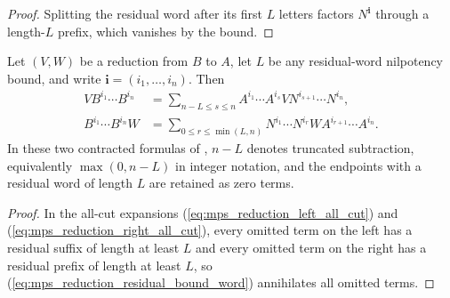 \begin{proof}
    \leanok
    Splitting the residual word after its first $L$ letters factors
    $N^{\mathbf i}$ through a length-$L$ prefix, which vanishes by the bound.
\end{proof}

\begin{lemma}
    \label{thm:mps_reduction_contracted_expansions}
    \leanok
    Let $(V,W)$ be a reduction from $B$ to $A$, let $L$ be any residual-word
    nilpotency bound, and write
    $\mathbf i=(i_1,\ldots,i_n)$.  Then
    \begin{align}
        VB^{i_1}\cdots B^{i_n}
         & =\sum_{n-L\leq s\leq n}
        A^{i_1}\cdots A^{i_s}V
        N^{i_{s+1}}\cdots N^{i_n},
        \label{eq:mps_reduction_left_contracted_expansion} \\
        B^{i_1}\cdots B^{i_n}W
         & =\sum_{0\leq r\leq\min(L,n)}
        N^{i_1}\cdots N^{i_r}W
        A^{i_{r+1}}\cdots A^{i_n}.
        \label{eq:mps_reduction_right_contracted_expansion}
    \end{align}
    In these two contracted formulas of \cite{Molnar2018SemiInjective},
    $n-L$ denotes truncated subtraction, equivalently $\max(0,n-L)$ in integer
    notation, and the endpoints with a residual word of length $L$ are
    retained as zero terms.
\end{lemma}

\begin{proof}
    \leanok
    In the all-cut expansions (\ref{eq:mps_reduction_left_all_cut}) and
    (\ref{eq:mps_reduction_right_all_cut}), every omitted term on the left has
    a residual suffix of length at least $L$ and every omitted term on the
    right has a residual prefix of length at least $L$, so
    (\ref{eq:mps_reduction_residual_bound_word}) annihilates all omitted
    terms.
\end{proof}

